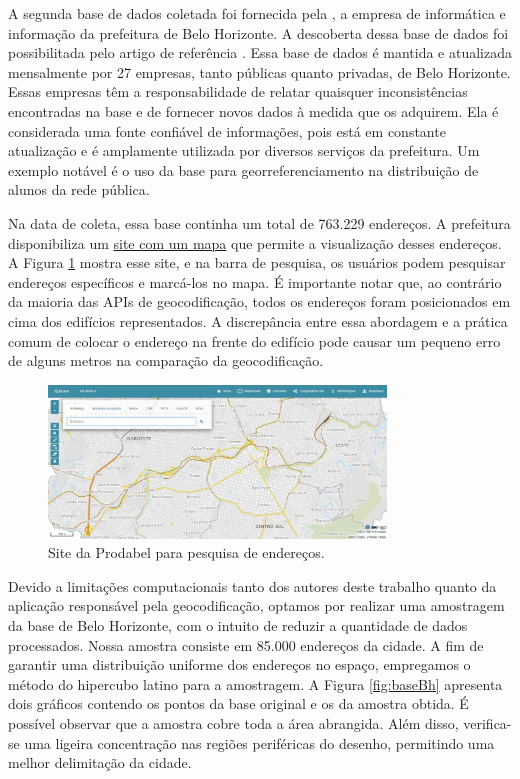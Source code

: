 A segunda base de dados coletada foi fornecida pela \cite{prodabel}, a empresa de informática e informação da prefeitura de Belo Horizonte. A descoberta dessa base de dados foi possibilitada pelo artigo de referência \cite{Clodoveu2011}. Essa base de dados é mantida e atualizada mensalmente por 27 empresas, tanto públicas quanto privadas, de Belo Horizonte. Essas empresas têm a responsabilidade de relatar quaisquer inconsistências encontradas na base e de fornecer novos dados à medida que os adquirem. Ela é considerada uma fonte confiável de informações, pois está em constante atualização e é amplamente utilizada por diversos serviços da prefeitura. Um exemplo notável é o uso da base para georreferenciamento na distribuição de alunos da rede pública.

Na data de coleta, essa base continha um total de 763.229 endereços. A prefeitura disponibiliza um \href{https://bhmap.pbh.gov.br}{site com um mapa} que permite a visualização desses endereços. A Figura \ref{fig:siteProdabel} mostra esse site, e na barra de pesquisa, os usuários podem pesquisar endereços específicos e marcá-los no mapa. É importante notar que, ao contrário da maioria das APIs de geocodificação, todos os endereços foram posicionados em cima dos edifícios representados. A discrepância entre essa abordagem e a prática comum de colocar o endereço na frente do edifício pode causar um pequeno erro de alguns metros na comparação da geocodificação.

\begin{figure}
    \centering
    \includegraphics[width=0.8\textwidth]{Figuras/siteProdabel.jpeg}
    \caption{Site da Prodabel para pesquisa de endereços. }
    \label{fig:siteProdabel}
\end{figure}

Devido a limitações computacionais tanto dos autores deste trabalho quanto da aplicação responsável pela geocodificação, optamos por realizar uma amostragem da base de Belo Horizonte, com o intuito de reduzir a quantidade de dados processados. Nossa amostra consiste em 85.000 endereços da cidade. A fim de garantir uma distribuição uniforme dos endereços no espaço, empregamos o método do hipercubo latino para a amostragem. A Figura \ref{fig:baseBh} apresenta dois gráficos contendo os pontos da base original e os da amostra obtida. É possível observar que a amostra cobre toda a área abrangida. Além disso, verifica-se uma ligeira concentração nas regiões periféricas do desenho, permitindo uma melhor delimitação da cidade.

